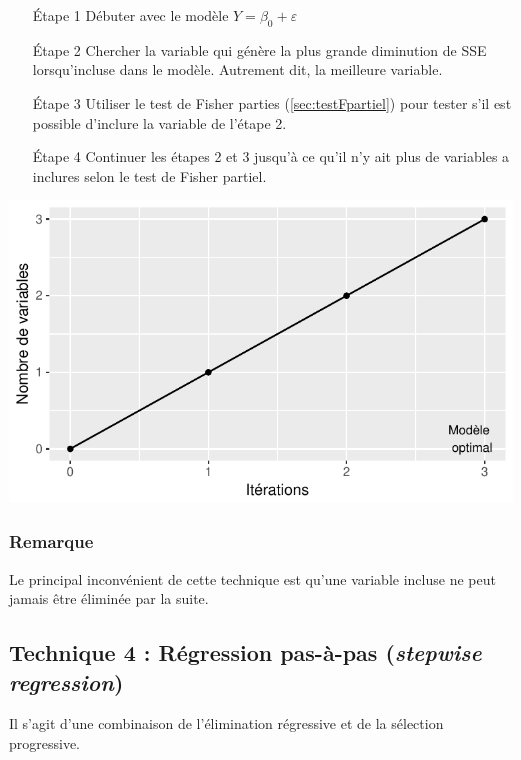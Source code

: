 \documentclass[11pt,french]{report}
\begin{document}
\begin{itemize}
\item [Étape 1] Débuter avec le modèle $Y = \beta_0 + \varepsilon$

\item [Étape 2] Chercher la variable qui génère la plus grande diminution de SSE lorsqu'incluse dans le modèle. Autrement dit, la meilleure variable.

\item [Étape 3] Utiliser le test de Fisher parties (\ref{sec:testFpartiel}) pour tester s'il est possible d'inclure la variable de l'étape 2.

\item [Étape 4] Continuer les étapes 2 et 3 jusqu'à ce qu'il n'y ait plus de variables a inclures selon le test de Fisher partiel.
\end{itemize}
\bigskip

\includegraphics{notes_de_cours-027}

\subsubsection*{Remarque}
Le principal inconvénient de cette technique est qu'une variable incluse ne peut jamais être éliminée par la suite. 

\subsection{Technique 4 : Régression pas-à-pas (\emph{stepwise regression})}
\label{tech4}

Il s'agit d'une combinaison de l'élimination régressive et de la sélection progressive.
\end{document}

